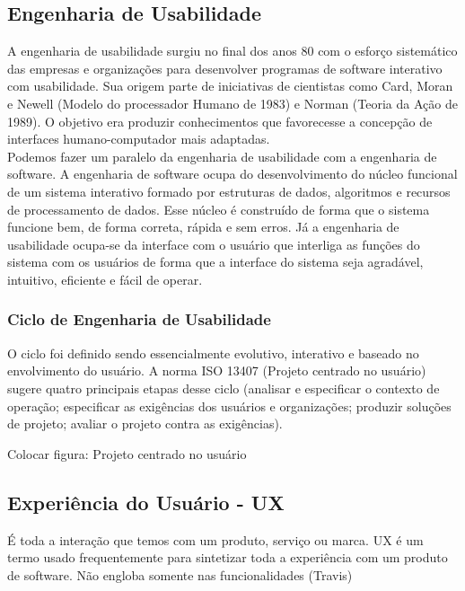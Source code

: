 \subsection{Engenharia de Usabilidade}

A engenharia de usabilidade surgiu no final dos anos 80 com o esforço sistemático das empresas e organizações para desenvolver programas de software interativo com usabilidade. Sua origem parte de iniciativas de cientistas como Card, Moran e Newell (Modelo do processador Humano de 1983) e Norman (Teoria da Ação de 1989). O objetivo era produzir conhecimentos que favorecesse a concepção de interfaces humano-computador mais adaptadas. ~\cite{cybis2010ergonomia}
\\
Podemos fazer um paralelo da engenharia de usabilidade com a engenharia de software. A engenharia de software ocupa do desenvolvimento do núcleo funcional de um sistema interativo formado por estruturas de dados, algoritmos e recursos de processamento de dados. Esse núcleo é construído de forma que o sistema funcione bem, de forma correta, rápida e sem erros. Já a engenharia de usabilidade ocupa-se da interface com o usuário que interliga as funções do sistema com os usuários de forma que a interface do sistema seja agradável, intuitivo, eficiente e fácil de operar.~\cite{cybis2010ergonomia}

\subsubsection{Ciclo de Engenharia de Usabilidade}

	O ciclo foi definido sendo essencialmente evolutivo, interativo e baseado no envolvimento do usuário. A norma ISO 13407 (Projeto centrado no usuário) sugere quatro principais etapas desse ciclo (analisar e especificar o contexto de operação; especificar as exigências dos usuários e organizações; produzir soluções de projeto; avaliar o projeto contra as exigências). ~\cite{cybis2010ergonomia}

Colocar figura: Projeto centrado no usuário

\subsection{Experiência do Usuário - UX}
É toda a interação que temos com um produto, serviço ou marca.
UX é um termo usado frequentemente para sintetizar toda a experiência com um produto de software. Não engloba  somente nas funcionalidades (Travis)

